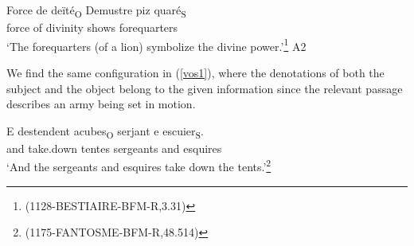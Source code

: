 \documentclass[output=paper,modfonts,nonflat]{langsci/langscibook}
\begin{document}
\ea
\gll Force de de\"{i}t\'{e}\textsubscript{O} Demustre {piz quar\'{e}}\textsubscript{S}\\
force of divinity shows forequarters \\
\glt  `The forequarters (of a lion) symbolize the divine power.'\footnote{{(1128-BESTIAIRE-BFM-R,3.31)}}\label{ovs3} \hfill A2
\z

We find the same configuration in (\ref{vos1}), where the denotations of both the subject and the object belong to the given information since the relevant passage describes an army being set in motion.

\ea
\gll E destendent acubes\textsubscript{O} serjant e escuier\textsubscript{S}.\\
and take.down tentes sergeants and esquires\\
\glt  `And the sergeants and esquires take down the tents.'\footnote{{(1175-FANTOSME-BFM-R,48.514)}} \hfill \label{vos1}
\z




\end{document}
